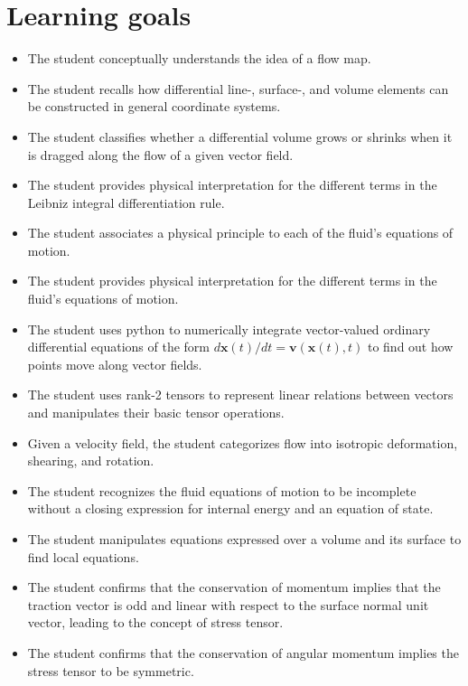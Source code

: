 \section{Learning goals}
\begin{itemize}
    \item[\elementary] The student conceptually understands the idea of a flow map.
    \item[\elementary] The student recalls how differential line-, surface-, and volume elements can be constructed in general coordinate systems.
    \item[\elementary] The student classifies whether a differential volume grows or shrinks when it is dragged along the flow of a given vector field.
    \item[\elementary] The student provides physical interpretation for the different terms in the Leibniz integral differentiation rule.
    \item[\elementary] The student associates a physical principle to each of the fluid's equations of motion.
    \item[\elementary] The student provides physical interpretation for the different terms in the fluid's equations of motion.
    \item[\intermediate] The student uses python to numerically integrate vector-valued ordinary differential equations of the form $d\bm{x}(t)/dt=\bm{v}(\bm{x}(t),t)$ to find out how points move along vector fields.
    \item[\intermediate] The student uses rank-2 tensors to represent linear relations between vectors and manipulates their basic tensor operations.
    \item[\intermediate] Given a velocity field, the student categorizes flow into isotropic deformation, shearing, and rotation.
    \item[\intermediate] The student recognizes the fluid equations of motion to be incomplete without a closing expression for internal energy and an equation of state.
    \item[\advanced] The student manipulates equations expressed over a volume and its surface to find local equations.
    \item[\advanced] The student confirms that the conservation of momentum implies that the traction vector is odd and linear with respect to the surface normal unit vector, leading to the concept of stress tensor.
    \item[\advanced] The student confirms that the conservation of angular momentum implies the stress tensor to be symmetric.
\end{itemize}


